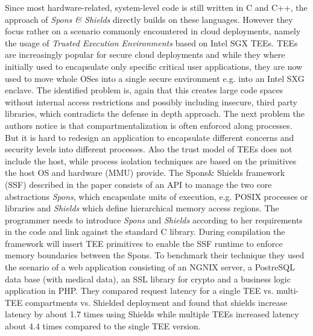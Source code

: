 Since most hardware-related, system-level code is still written in C and C++, the approach of \emph{Spons \& Shields}\cite{SponsAndShields} directly builds on these languages. However  they focus rather on a scenario commonly encountered in cloud deployments, namely the usage of \emph{Trusted Execution Environments} based on Intel SGX TEEs. TEEs are increasingly popular for secure cloud deployments and while they where initially used to encapsulate only specific critical user applications, they are now used to move whole OSes into a single secure environment e.g. into an Intel SXG enclave. The identified problem is, again that this creates large code spaces without internal access restrictions and possibly including insecure, third party libraries, which contradicts the defense in depth approach. The next problem the authors notice is that compartmentalization is often enforced along processes. But it is hard to redesign an application to encapsulate different concerns and security levels into different processes. Also the trust model of TEEs does not include the host, while process isolation techniques are based on the primitives the host OS and hardware (MMU) provide. The Spons\& Shields framework (SSF) described in the paper consists of an API to manage the two core abstractions \emph{Spons}, which encapsulate units of execution, e.g. POSIX processes or libraries and \emph{Shields} which define hierarchical memory access regions. The programmer needs to introduce \emph{Spons} and \emph{Shields} according to her requirements in the code and link against the  standard C library. During compilation the framework will insert TEE primitives to enable the SSF runtime to enforce memory boundaries between the Spons. To benchmark their technique they used the scenario of a web application consisting of an NGNIX server, a PostreSQL data base (with medical data), an SSL library for crypto and a business logic application in PHP. They compared request latency for a single TEE vs. multi-TEE compartments vs. Shielded deployment and found that shields increase latency by about 1.7 times using Shields while multiple TEEs increased latency about 4.4 times compared to the single TEE version.

